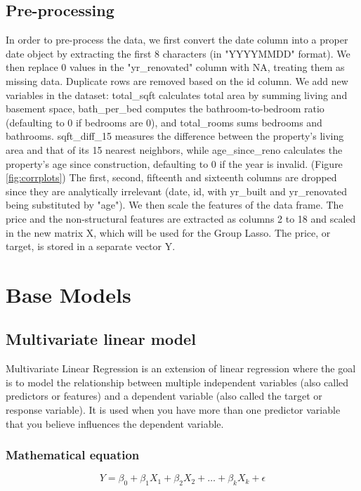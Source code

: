 \documentclass[a4paper, 11pt]{article}
\begin{document}
\begin{multicols}{2}
\subsection{Pre-processing} \vspace{-3pt}
In order to pre-process the data, we first convert the date column into a proper date object by extracting the first 8 characters (in "YYYYMMDD" format). We then replace 0 values in the "yr{\_}renovated" column with NA, treating them as missing data. Duplicate rows are removed based on the id column.
We add new variables in the dataset: total{\_}sqft calculates total area by summing living and basement space, bath{\_}per{\_}bed computes the bathroom-to-bedroom ratio (defaulting to 0 if bedrooms are 0), and total{\_}rooms sums bedrooms and bathrooms. sqft{\_}diff{\_}15 measures the difference between the property’s living area and that of its 15 nearest neighbors, while age{\_}since{\_}reno calculates the property’s age since construction, defaulting to 0 if the year is invalid. (Figure \ref{fig:corrplots})
The first, second, fifteenth and sixteenth columns are dropped since they are analytically irrelevant (date, id, with yr{\_}built and yr{\_}renovated being substituted by "age"). We then scale the features of the data frame.
The price and the non-structural features are extracted as columns 2 to 18 and scaled in the new matrix X, which will be used for the Group Lasso. The price, or target, is stored in a separate vector Y.

\section{Base Models} \vspace{-7pt}
\subsection{Multivariate linear model} \vspace{-3pt}
Multivariate Linear Regression is an extension of linear regression where the goal is to model the relationship between multiple independent variables (also called predictors or features) and a dependent variable (also called the target or response variable). It is used when you have more than one predictor variable that you believe influences the dependent variable.

\subsubsection*{Mathematical equation}
\begin{equation}
Y=\beta_0+\beta_1X_1+\beta_2X_2+\dots+\beta_kX_k+\epsilon
\end{equation}


\end{multicols}
\end{document}
